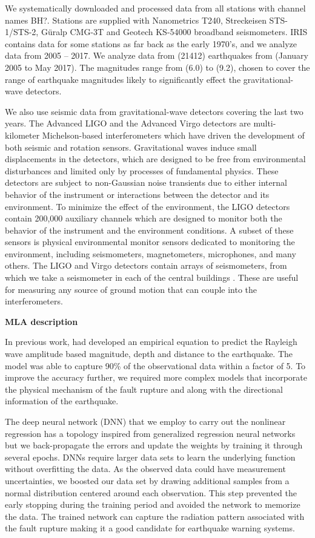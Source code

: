 \documentclass[preprint, aps, showpacs]{revtex4-1}
\newcommand{\rednote}[1]{{\color{red} (#1)}}
\begin{document}
We systematically downloaded and processed data from all stations with channel names BH?. Stations are supplied with Nanometrics T240, Streckeisen STS-1/STS-2, G\"uralp CMG-3T and Geotech KS-54000 broadband seismometers. 
IRIS contains data for some stations as far back as the early 1970's, and we analyze data from 2005 -- 2017.
We analyze data from \rednote{21412} earthquakes from \rednote{January 2005 to May 2017}.
The magnitudes range from \rednote{6.0} to \rednote{9.2}, chosen to cover the range of earthquake magnitudes likely to significantly effect the gravitational-wave detectors.

We also use seismic data from gravitational-wave detectors covering the last two years.
The Advanced LIGO \cite{aligo} and the Advanced Virgo \cite{avirgo}  detectors are multi-kilometer Michelson-based interferometers which have driven the development of both seismic \cite{BeCa2016} and rotation \cite{VeHa2014} sensors.
Gravitational waves induce small displacements in the detectors, which are designed to be free from environmental disturbances and limited only by processes of fundamental physics.
These detectors are subject to non-Gaussian noise transients due to either internal behavior of the instrument or interactions between the detector and its environment. To minimize the effect of the environment, the LIGO detectors contain 200,000 auxiliary channels which are designed to monitor both the behavior of the instrument and the environment conditions.
A subset of these sensors is physical environmental monitor sensors dedicated to monitoring the environment, including seismometers, magnetometers, microphones, and many others.
The LIGO and Virgo detectors contain arrays of seismometers, from which we take a seismometer in each of the central buildings \cite{AbEA2016f}. These are useful for measuring any source of ground motion that can couple into the interferometers.

\textbf{MLA description}

In previous work, \cite{CoEa2017} had developed an empirical equation to predict the Rayleigh wave amplitude based magnitude, depth and distance to the earthquake. The model was able to capture 90\% of the observational data within a factor of 5. To improve the accuracy further, we required more complex models that incorporate the physical mechanism of the fault rupture and along with the directional information of the earthquake. 

The deep neural network (DNN) that we employ to carry out the nonlinear regression has a topology inspired from generalized regression neural networks but we back-propagate the errors and update the weights by training it through several epochs.   DNNs require larger data sets to learn the underlying function without overfitting the data. As the observed data could have measurement uncertainties, we boosted our data set by drawing additional samples from a normal distribution centered around each observation. This step prevented the early stopping during the training period and avoided the network to memorize the data.  The trained network can capture the radiation pattern associated with the fault rupture making it a good candidate for earthquake warning systems. 
\end{document}
